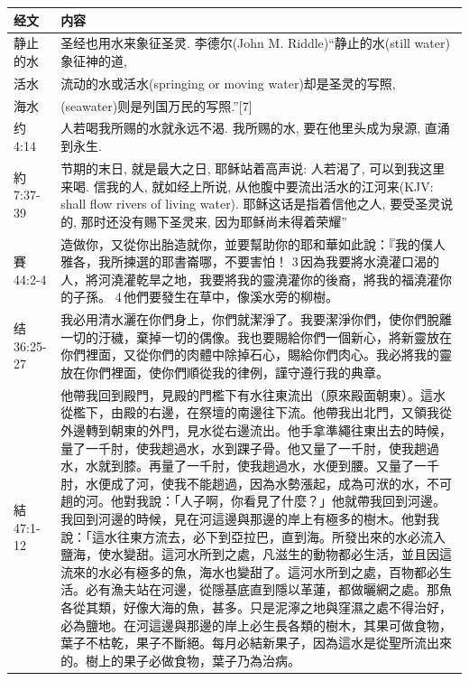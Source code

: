 \begin{table}[H]
\centering
\begin{tabular}{p{4em}|p{46em}}  \toprule
经文&内容\\  \midrule
静止的水&圣经也用水来象征圣灵. 李德尔(John M. Riddle)“静止的水(still water)象征神的道, \\  \midrule
活水&流动的水或活水(springing or moving water)却是圣灵的写照, \\  \midrule
海水&(seawater)则是列国万民的写照.”[7]\\  \midrule
约4:14&人若喝我所赐的水就永远不渴. 我所赐的水, 要在他里头成为泉源, 直涌到永生.\\  \midrule
約7:37-39&节期的末日, 就是最大之日, 耶稣站着高声说: 人若渴了, 可以到我这里来喝. 信我的人, 就如经上所说, 从他腹中要流出活水的江河来(KJV: shall flow rivers of living water). 耶稣这话是指着信他之人, 要受圣灵说的, 那时还没有赐下圣灵来, 因为耶稣尚未得着荣耀”\\  \midrule
賽44:2-4&造做你，又從你出胎造就你，並要幫助你的耶和華如此說：『我的僕人雅各，我所揀選的耶書崙哪，不要害怕！ 3 因為我要將水澆灌口渴的人，將河澆灌乾旱之地，我要將我的靈澆灌你的後裔，將我的福澆灌你的子孫。 4 他們要發生在草中，像溪水旁的柳樹。\\  \midrule
结36:25-27&我必用清水灑在你們身上，你們就潔淨了。我要潔淨你們，使你們脫離一切的汙穢，棄掉一切的偶像。我也要賜給你們一個新心，將新靈放在你們裡面，又從你們的肉體中除掉石心，賜給你們肉心。我必將我的靈放在你們裡面，使你們順從我的律例，謹守遵行我的典章。\\  \midrule
結47:1-12&他帶我回到殿門，見殿的門檻下有水往東流出（原來殿面朝東）。這水從檻下，由殿的右邊，在祭壇的南邊往下流。他帶我出北門，又領我從外邊轉到朝東的外門，見水從右邊流出。他手拿準繩往東出去的時候，量了一千肘，使我趟過水，水到踝子骨。他又量了一千肘，使我趟過水，水就到膝。再量了一千肘，使我趟過水，水便到腰。又量了一千肘，水便成了河，使我不能趟過，因為水勢漲起，成為可洑的水，不可趟的河。他對我說：「人子啊，你看見了什麼？」他就帶我回到河邊。我回到河邊的時候，見在河這邊與那邊的岸上有極多的樹木。他對我說：「這水往東方流去，必下到亞拉巴，直到海。所發出來的水必流入鹽海，使水變甜。這河水所到之處，凡滋生的動物都必生活，並且因這流來的水必有極多的魚，海水也變甜了。這河水所到之處，百物都必生活。必有漁夫站在河邊，從隱基底直到隱以革蓮，都做曬網之處。那魚各從其類，好像大海的魚，甚多。只是泥濘之地與窪濕之處不得治好，必為鹽地。在河這邊與那邊的岸上必生長各類的樹木，其果可做食物，葉子不枯乾，果子不斷絕。每月必結新果子，因為這水是從聖所流出來的。樹上的果子必做食物，葉子乃為治病。\\  \midrule
\end{tabular}
\end{table}
 
